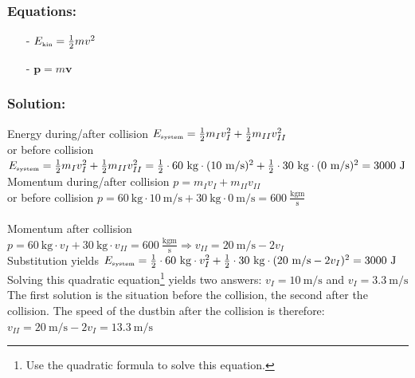 \documentclass[12pt,a4paper]{article}
\numberwithin{equation}{section}
\numberwithin{figure}{section}
\numberwithin{table}{section}
\begin{document}
\subsubsection*{Equations:}
\begin{itemize}
\item[-] $E_{\begin{tiny}\mbox{kin}\end{tiny}}=\frac{1}{2}mv^2$
\item[-] $\textbf{p}=m\textbf{v}$
\end{itemize}

\subsubsection*{Solution:}
\begin{doublespace}
Energy during/after collision $E_{\begin{tiny}\mbox{system}\end{tiny}}=\frac{1}{2}m_I v_I^2 + \frac{1}{2}m_{II} v_{II}^2$\\
or before collision $E_{\begin{tiny}\mbox{system}\end{tiny}}=\frac{1}{2}m_I v_I^2 + \frac{1}{2}m_{II} v_{II}^2 =\frac{1}{2} \cdot 60~\mbox{kg} \cdot (10~\mbox{m/s})^2 + \frac{1}{2} \cdot 30~\mbox{kg} \cdot (0~\mbox{m/s})^2 = 3000~\mbox{J}$\\
Momentum during/after collision $p=m_I v_I + m_{II} v_{II}$\\
or before collision $p=60~\mbox{kg} \cdot 10~\mbox{m/s} + 30~\mbox{kg} \cdot 0~\mbox{m/s} = 600~\frac{\mbox{kgm}}{\mbox{s}}$\\ \\
Momentum after collision $p=60~\mbox{kg} \cdot v_I + 30~\mbox{kg} \cdot v_{II} = 600~\frac{\mbox{kgm}}{\mbox{s}} \Longrightarrow v_{II} = 20~\mbox{m/s} - 2v_I$  \\
Substitution yields $E_{\begin{tiny}\mbox{system}\end{tiny}}=\frac{1}{2} \cdot 60~\mbox{kg} \cdot v_I^2 + \frac{1}{2} \cdot 30~\mbox{kg} \cdot (20~\mbox{m/s} - 2v_I)^2 = 3000~\mbox{J}$\\
Solving this quadratic equation\footnote{Use the quadratic formula to solve this equation.} yields two answers: $v_I=10~\mbox{m/s}$ and $v_I=3.3~\mbox{m/s}$\\
The first solution is the situation before the collision, the second after the collision. The speed of the dustbin after the collision is therefore: $v_{II}=20~\mbox{m/s} - 2v_{I}=13.3~\mbox{m/s}$
\end{doublespace}
\end{document}
